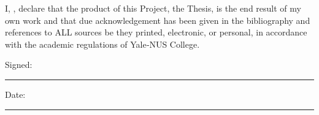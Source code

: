 \documentclass[
12pt, %
oneside, %
english, %
doublespacing, %
headsepline, %
]{MastersDoctoralThesis} %
\begin{document}

\begin{declaration}
\addchaptertocentry{\authorshipname} %

\noindent I, \authorname, declare that the product of this Project, the Thesis, is the end result of my own work and that due acknowledgement has been given in the bibliography and references to ALL sources be they  printed, electronic, or personal, in accordance with the academic regulations of Yale‐NUS College.

%

\noindent Signed:\\
\rule[0.5em]{25em}{0.5pt} %

\noindent Date:\\
\rule[0.5em]{25em}{0.5pt} %
\end{declaration}

\cleardoublepage

\end{document}
